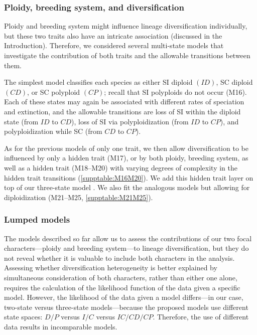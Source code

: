 \subsubsection{Ploidy, breeding system, and diversification}

Ploidy and breeding system might influence lineage diversification individually, but these two traits also have an intricate association (discussed in the Introduction).
Therefore, we considered several multi-state models that investigate the contribution of both traits and the allowable transitions between them.

The simplest model classifies each species as either SI diploid $(ID)$, SC diploid $(CD)$, or SC polyploid $(CP)$; recall that SI polyploids do not occur (M16).
Each of these states may again be associated with different rates of speciation and extinction, and the allowable transitions are loss of SI within the diploid state (from $ID$ to $CD$), loss of SI via polyploidization (from $ID$ to $CP$), and polyploidization while SC (from $CD$ to $CP$).

As for the previous models of only one trait, we then allow diversification to be influenced by only a hidden trait (M17), or by both ploidy, breeding system, as well as a hidden trait (M18--M20) with varying degrees of complexity in the hidden trait transitions (\cref{supptable:M16M20}).
We add this hidden trait layer on top of our three-state model \citep[similar to][]{caetano_2018, huang_2018}.
We also fit the analogous models but allowing for diploidization (M21--M25, \cref{supptable:M21M25}).

\subsubsection{Lumped models}

The models described so far allow us to assess the contributions of our two focal characters---ploidy and breeding system---to lineage diversification, but they do not reveal whether it is valuable to include both characters in the analysis.
Assessing whether diversification heterogeneity is better explained by simultaneous consideration of both characters, rather than either one alone, requires the calculation of the likelihood function of the data given a specific model.
However, the likelihood of the data given a model differs---in our case, two-state versus three-state models---because the proposed models use different state spaces: $D/P$ versus $I/C$ versus $IC/CD/CP$. Therefore, the use of different data results in incomparable models.

